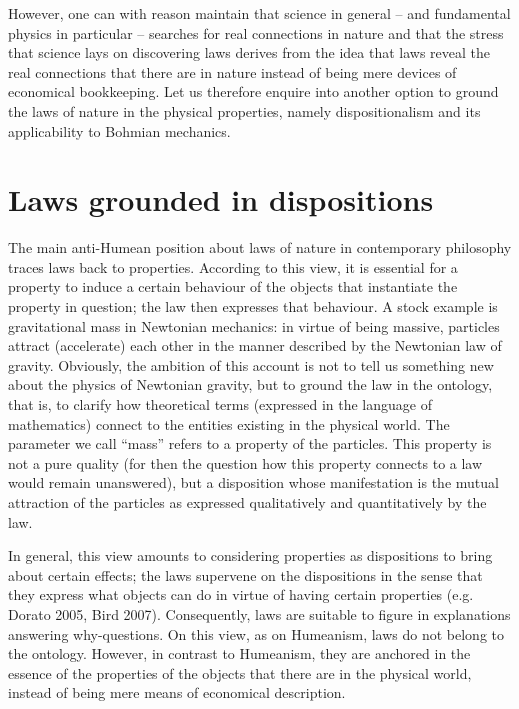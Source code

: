 \documentclass[12pt]{article}
\theoremstyle{definition}
\begin{document}
However, one can with reason maintain that science in general -- and fundamental physics in particular -- searches for real connections in nature and that the stress that science lays on discovering laws derives from the idea that laws reveal the real connections that there are in nature instead of being mere devices of economical bookkeeping. Let us therefore enquire into another option to ground the laws of nature in the physical properties, namely dispositionalism and its applicability to Bohmian mechanics.

\section{Laws grounded in dispositions}
The main anti-Humean position about laws of nature in contemporary philosophy traces laws back to properties. According to this view, it is essential for a property to induce a certain behaviour of the objects that instantiate the property in question; the law then expresses that behaviour. A stock example is gravitational mass in Newtonian mechanics: in virtue of being massive, particles attract (accelerate) each other in the manner described by the Newtonian law of gravity. Obviously, the ambition of this account is not to tell us something new about the physics of Newtonian gravity, but to ground the law in the ontology, that is, to clarify how theoretical terms (expressed in the language of mathematics) connect to the entities existing in the physical world. The parameter we call ``mass'' refers to a property of the particles. This property is not a pure quality (for then the question how this property connects to a law would remain unanswered), but a disposition whose manifestation is the mutual attraction of the particles as expressed qualitatively and quantitatively by the law.

In general, this view amounts to considering properties as dispositions to bring about certain effects; the laws supervene on the dispositions in the sense that they express what objects can do in virtue of having certain properties (e.g. Dorato 2005, Bird 2007). Consequently, laws are suitable to figure in explanations answering why-questions. On this view, as on Humeanism, laws do not belong to the ontology. However, in contrast to Humeanism, they are anchored in the essence of the properties of the objects that there are in the physical world, instead of being mere means of economical description.
\end{document}

